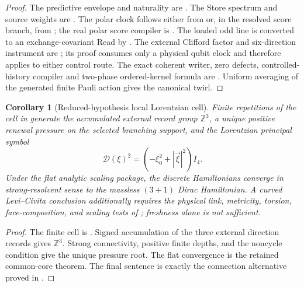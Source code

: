 \documentclass[11pt]{article}
\newtheorem{corollary}[theorem]{Corollary}
\theoremstyle{definition}
\theoremstyle{remark}
\newcommand{\Z}{\mathbb Z}
\begin{document}
\begin{proof}
The predictive envelope and naturality are
.
The Store spectrum and source weights are
.
The polar clock follows either from
 or, in the resolved score branch, from
; the real polar score compiler is
.  The loaded odd line is converted to an
exchange-covariant Read by
.  The external Clifford factor and
six-direction instrument are ; its
proof consumes only a physical qubit clock and therefore applies to either
control route.  The exact coherent writer, zero defects, controlled-history
compiler and two-phase ordered-kernel formula are
.
Uniform averaging of the generated finite Pauli action gives the canonical
twirl.
\end{proof}

\begin{corollary}[Reduced-hypothesis local Lorentzian cell]
\label{cor:reduced-hypothesis-spacetime}
Finite repetitions of the cell in
 generate the accumulated external record
group $\Z^3$, a unique positive renewal pressure on the selected branching
support, and the Lorentzian principal symbol
\[
 \mathscr D(\xi)^2=(-\xi_0^2+|\vec\xi|^2)I_4.
\]
Under the flat analytic scaling package, the discrete Hamiltonians converge in
strong-resolvent sense to the massless $(3+1)$ Dirac Hamiltonian.  A curved
Levi--Civita conclusion additionally requires the physical link, metricity,
torsion, face-composition, and scaling tests of
; freshness alone is not sufficient.
\end{corollary}

\begin{proof}
The finite cell is .  Signed accumulation
of the three external direction records gives $\Z^3$.  Strong connectivity,
positive finite depths, and the noncycle condition give the unique pressure
root.  The flat convergence is the retained common-core theorem.  The final
sentence is exactly the connection alternative proved in
.
\end{proof}
\end{document}
